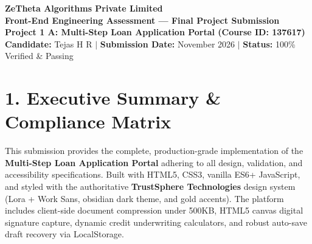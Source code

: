 \documentclass[11pt,a4paper]{article}
\begin{document}
\begin{center}
    {\LARGE \textbf{\color{primary}ZeTheta Algorithms Private Limited}}\\[4pt]
    {\large \textbf{Front-End Engineering Assessment — Final Project Submission}}\\[2pt]
    \textbf{Project 1 A: Multi-Step Loan Application Portal (Course ID: 137617)}\\[3pt]
    \textbf{Candidate:} Tejas H R \quad $|$ \quad \textbf{Submission Date:} November 2026 \quad $|$ \quad \textbf{Status:} 100\% Verified \& Passing
\end{center}

\vspace{6pt}

\section{1. Executive Summary \& Compliance Matrix}
This submission provides the complete, production-grade implementation of the \textbf{Multi-Step Loan Application Portal} adhering to all design, validation, and accessibility specifications. Built with HTML5, CSS3, vanilla ES6+ JavaScript, and styled with the authoritative \textbf{TrustSphere Technologies} design system (Lora + Work Sans, obsidian dark theme, and gold accents). The platform includes client-side document compression under 500KB, HTML5 canvas digital signature capture, dynamic credit underwriting calculators, and robust auto-save draft recovery via LocalStorage.
\end{document}
